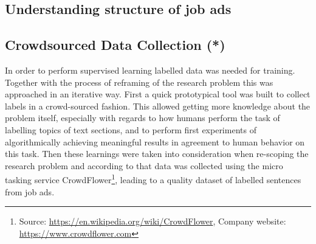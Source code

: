 \subsection{Understanding structure of job ads}
\label{sub:Understanding structure of job ads}

%
%
%
%


\subsection{Crowdsourced Data Collection (*)}


In order to perform supervised learning labelled data was needed for training. Together with the process of reframing of the research problem this was approached in an iterative way. First a quick prototypical tool was built to collect labels in a crowd-sourced fashion. This allowed getting more knowledge about the problem itself, especially with regards to how humans perform the task of labelling topics of text sections, and to perform first experiments of algorithmically achieving meaningful results in agreement to human behavior on this task.
Then these learnings were taken into consideration when re-scoping the research problem and according to that data was collected using the micro tasking service CrowdFlower\footnote{ Source: \url{https://en.wikipedia.org/wiki/CrowdFlower}, Company website: \url{https://www.crowdflower.com}}, leading to a quality dataset of labelled sentences from job ads.


